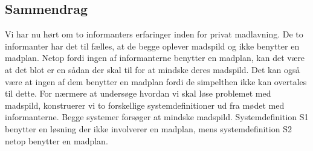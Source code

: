 \subsection{Sammendrag}
Vi har nu hørt om to informanters erfaringer inden for privat madlavning. De to informanter har det til fælles, at de begge oplever madspild og ikke benytter en madplan. Netop fordi ingen af informanterne benytter en madplan, kan det være at det blot er en sådan der skal til for at mindske deres madspild. Det kan også være at ingen af dem benytter en madplan fordi de simpelthen ikke kan overtales til dette. For nærmere at undersøge hvordan vi skal løse problemet med madspild, konstruerer vi to forskellige systemdefinitioner ud fra mødet med informanterne. Begge systemer forsøger at mindske madspild. Systemdefinition S1 benytter en løsning der ikke involverer en madplan, mens systemdefinition S2 netop benytter en madplan.
